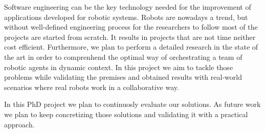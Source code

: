 Software engineering can be the key technology needed for the improvement of applications developed for robotic systems.
Robots are nowadays a trend, but without well-defined engineering process for the researchers to follow most of the projects are started from scratch.
It results in projects that are not time neither cost efficient.
Furthermore, we plan to perform a detailed research in the state of the art in order to comprenhend the optimal way of orchestrating a team of robotic agents in dynamic context.
In this project we aim to tackle those problems while validating the premises and obtained results with real-world scenarios where real robots work in a collaborative way.

In this PhD project we plan to continuosly evaluate our solutions.
As future work we plan to keep concretizing those solutions and validating it with a practical approach.


